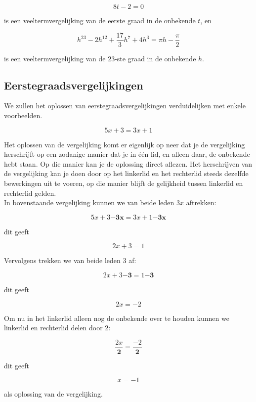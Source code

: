 \[ 8t-2=0 \]

is een veeltermvergelijking van de eerste graad in de onbekende $t$, en

\[ h^{23} -2h^{12} + \frac{17}{3} h^7 + 4h^3 = \pi h -\frac{\pi}{2} \]

is een veeltermvergelijking van de $23$-ste graad in de onbekende $h$.\\

\newpage

\subsection{Eerstegraadsvergelijkingen}

We zullen het oplossen van eerstegraadsvergelijkingen verduidelijken met enkele voorbeelden.


\begin{voorbeeld}

\[5x+3=3x+1\]

Het oplossen van de vergelijking komt er eigenlijk op neer dat je de vergelijking herschrijft op een zodanige manier dat je in \'{e}\'{e}n lid, en alleen daar, de onbekende hebt staan. Op die manier kan je de oplossing direct aflezen.
Het herschrijven van de vergelijking kan je doen door op het linkerlid en het rechterlid steeds dezelfde bewerkingen uit te voeren, op die manier blijft de gelijkheid tussen linkerlid en rechterlid gelden.\\
In bovenstaande vergelijking kunnen we van beide leden $3x$ aftrekken:

\[ 5x+3 \boldsymbol{-3x} = 3x +1 \boldsymbol{-3x} \]

dit geeft

\[ 2x+3 = 1 \]

Vervolgens trekken we van beide leden $3$ af:

\[ 2x+3 \boldsymbol{-3} = 1 \boldsymbol{-3} \]

dit geeft

\[ 2x = -2 \]

Om nu in het linkerlid alleen nog de onbekende over te houden kunnen we linkerlid en rechterlid delen door $2$:

\[ \frac{2x}{\boldsymbol{2}} = \frac{-2}{\boldsymbol{2}} \]

dit geeft

\[ x=-1 \]

als oplossing van de vergelijking.\\

\end{voorbeeld}

